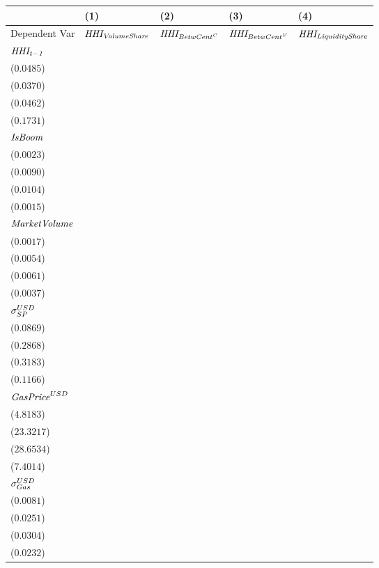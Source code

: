\begin{tabular}{lllll}
\toprule
{} &                                       (1) &                                        (2) &                                       (3) &                                     (4) \\
\midrule
Dependent Var               &                 ${\it HHI_{VolumeShare}}$ &                 ${\it HHI_{{BetwCent}^C}}$ &                ${\it HHI_{{BetwCent}^V}}$ &            ${\it HHI_{LiquidityShare}}$ \\
$\it HHI_{t-1}$             &   \makecell{$0.4466^{***}$ \\ ($0.0485$)} &    \makecell{$0.6555^{***}$ \\ ($0.0370$)} &   \makecell{$0.6604^{***}$ \\ ($0.0462$)} &  \makecell{$0.3992^{**}$ \\ ($0.1731$)} \\
${\it IsBoom}$              &      \makecell{$0.0034^{}$ \\ ($0.0023$)} &    \makecell{$0.0312^{***}$ \\ ($0.0090$)} &   \makecell{$0.0396^{***}$ \\ ($0.0104$)} &  \makecell{$0.0038^{**}$ \\ ($0.0015$)} \\
${\it MarketVolume}$        &      \makecell{$0.0023^{}$ \\ ($0.0017$)} &       \makecell{$0.0036^{}$ \\ ($0.0054$)} &     \makecell{$-0.0030^{}$ \\ ($0.0061$)} &   \makecell{$-0.0043^{}$ \\ ($0.0037$)} \\
${\it \sigma}^{USD}_{SP}$   &      \makecell{$0.0380^{}$ \\ ($0.0869$)} &       \makecell{$0.4528^{}$ \\ ($0.2868$)} &     \makecell{$-0.4865^{}$ \\ ($0.3183$)} &  \makecell{$-0.2135^{*}$ \\ ($0.1166$)} \\
${\it GasPrice}^{USD}$      &  \makecell{$-11.1508^{**}$ \\ ($4.8183$)} &  \makecell{$70.1972^{***}$ \\ ($23.3217$)} &  \makecell{$71.4545^{**}$ \\ ($28.6534$)} &   \makecell{$-9.1603^{}$ \\ ($7.4014$)} \\
${\it \sigma}_{Gas}^{USD}$  &   \makecell{$-0.0169^{**}$ \\ ($0.0081$)} &    \makecell{$0.0702^{***}$ \\ ($0.0251$)} &    \makecell{$0.0768^{**}$ \\ ($0.0304$)} &    \makecell{$0.0087^{}$ \\ ($0.0232$)} \\

\end{tabular}
